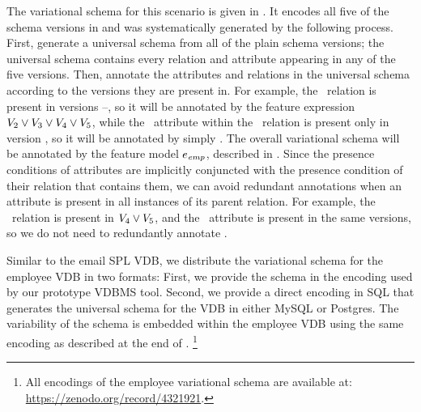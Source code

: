 

The variational schema for this scenario is given in . It
encodes all five of the schema versions in  and was
systematically generated by the following process. First, generate a universal
schema from all of the plain schema versions; the universal schema contains
every relation and attribute appearing in any of the five versions. Then,
annotate the attributes and relations in the universal schema according to the
versions they are present in.
%
For example, the \empacct\ relation is present in versions \vTwo--\vFive, so it
will be annotated by the feature expression
$\vTwo\vee\vThree\vee\vFour\vee\vFive$, while the \salary\ attribute within the
\empacct\ relation is present only in version \vFive, so it will be annotated
by simply \vFive.
%
 The overall variational schema will be annotated by the feature model
 $\dimMeta_\employee$, described in .
%
Since the presence conditions of attributes are implicitly conjuncted with the
presence condition of their relation
 that contains them, 
 we can avoid redundant
annotations when an attribute is present in all instances of its parent
relation. For example, the \empbio\ relation is present in $\vFour\vee\vFive$,
and the \birthdate\ attribute is present in the same versions, so we do not
need to redundantly annotate 
 \birthdate.

Similar to the email SPL VDB, we distribute the variational schema for the
employee VDB in two formats:
%
First, we provide the schema in the encoding used by our prototype VDBMS tool.%
%
Second, we provide a direct encoding in SQL that generates the universal schema
for the VDB in either MySQL or Postgres.%
%
The variability of the schema is embedded within the employee VDB%
%
using the same encoding as described at the end of .%
\footnote{All encodings of the employee variational schema are available at: \url{https://zenodo.org/record/4321921}.} 

